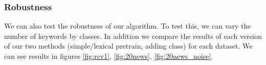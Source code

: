 \subsubsection{Robustness}

We can also test the robustness of our algorithm. To test this, we
can vary the number of keywords by classes. In addition we compare
the results of each version of our two methods (simple/lexical pretrain, adding 
class) for each dataset.
We can see results  in 
figures \ref{fig:rcv1}, \ref{fig:20news}, \ref{fig:20news_noise}.
\begin{figure}
  \begin{subfigure}[b]{\hsize}
    \centering
  \end{subfigure}
  \begin{subfigure}[b]{\hsize}
    \centering

\end{subfigure}
\end{figure}
